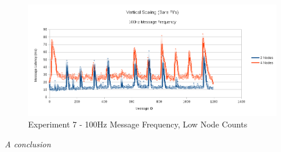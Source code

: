 \documentclass[../dissertation.tex]{subfiles}
\begin{document}
\begin{figure}[H]
\centering
\includegraphics[width=\textwidth]{images/experiment7/vertical_scaling_100hz_low_freqs.png}
\caption{Experiment 7 - 100Hz Message Frequency, Low Node Counts}
\label{exp7-100hz-lownodes}
\end{figure}

\textit{A conclusion}
\end{document}
